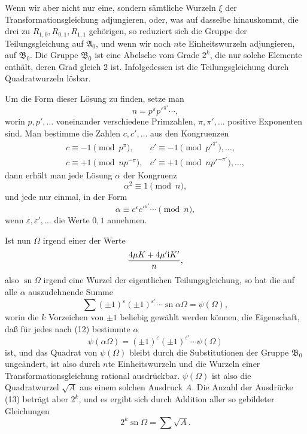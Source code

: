 \documentclass[11pt]{article}
\providecommand{\sn}{\operatorname{sn}}
\providecommand{\ii}{\mathrm{i}}
\begin{document}
Wenn wir aber nicht nur eine, sondern sämtliche Wurzeln $\xi$ der Transformationsgleichung
adjungieren, oder, was auf dasselbe hinauskommt, die drei zu $R_{1,0},R_{0,1},R_{1,1}$
gehörigen, so reduziert sich die Gruppe der Teilungsgleichung auf $\mathfrak A_0$, und wenn
wir noch $n$te Einheitswurzeln adjungieren, auf $\mathfrak B_0$. Die Gruppe $\mathfrak B_0$
ist eine Abelsche vom Grade $2^k$, die nur solche Elemente enthält, deren Grad gleich $2$
ist. Infolgedessen ist die Teilungsgleichung durch Quadratwurzeln lösbar.

Um die Form dieser Lösung zu finden, setze man
\[
 n=p^\pi p'^{\pi'}\cdots,
\]
worin $p,p',\ldots$ voneinander verschiedene Primzahlen, $\pi,\pi',\ldots$ positive
Exponenten sind. Man bestimme die Zahlen $c,c',\ldots$ aus den Kongruenzen
\[
\begin{array}{ll}
 c\equiv-1\pmod {p^\pi},& c'\equiv-1\pmod {p'^{\pi'}},\ldots,\\
 c\equiv+1\pmod {n p^{-\pi}},& c'\equiv+1\pmod {n p'^{-\pi'}},\ldots,
\end{array}
\]
dann erhält man jede Lösung $\alpha$ der Kongruenz
\[
 \alpha^2\equiv1\pmod n,
\]
und jede nur einmal, in der Form
\begin{equation}
 \alpha\equiv c^\varepsilon c'^{\varepsilon'}\cdots\pmod n,
\tag{12}
\end{equation}
wenn $\varepsilon,\varepsilon',\ldots$ die Werte $0,1$ annehmen.

Ist nun $\Omega$ irgend einer der Werte
\[
 {4\mu K+4\mu'\ii K'\over n},
\]
also $\sn\Omega$ irgend eine Wurzel der eigentlichen Teilungsgleichung, so hat die auf alle
$\alpha$ auszudehnende Summe
\begin{equation}
 \sum(\pm1)^\varepsilon(\pm1)^{\varepsilon'}\cdots\sn\alpha\Omega=\psi(\Omega),
\tag{13}
\end{equation}
worin die $k$ Vorzeichen von $\pm1$ beliebig gewählt werden können, die Eigenschaft, daß
für jedes nach (12) bestimmte $\alpha$
\begin{equation}
 \psi(\alpha\Omega)=(\pm1)^\varepsilon(\pm1)^{\varepsilon'}\cdots\psi(\Omega)
\tag{14}
\end{equation}
ist, und das Quadrat von $\psi(\Omega)$ bleibt durch die Substitutionen der Gruppe
$\mathfrak B_0$ ungeändert, ist also durch $n$te Einheitswurzeln und die Wurzeln einer
Transformationsgleichung rational ausdrückbar. $\psi(\Omega)$ ist also die Quadratwurzel
$\sqrt A$ aus einem solchen Ausdruck $A$. Die Anzahl der Ausdrücke (13) beträgt aber
$2^k$, und es ergibt sich durch Addition aller so gebildeter Gleichungen
\begin{equation}
 2^k\sn\Omega=\sum\sqrt A.
\tag{15}
\end{equation}
\end{document}
